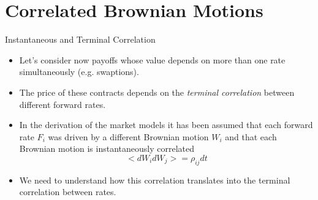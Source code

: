 \documentclass{beamer}
\begin{document}
\section{Correlated Brownian Motions}
\begin{frame}{Instantaneous and Terminal Correlation}
\begin{itemize}
\item<1-> Let's consider now payoffs whose value depends on more than one rate simultaneously (e.g. swaptions).
\item<1-> The price of these contracts depends on the \emph{terminal correlation} between different forward rates.
\item<2-> In the derivation of the market models it has been assumed that each forward rate $F_i$ was driven by a different Brownian motion $W_i$ and that each Brownian motion is instantaneously correlated
\begin{equation}
< dW_i dW_j> = \rho_{ij} dt
\end{equation}
\item<3-> We need to understand how this correlation translates into the terminal correlation between rates.
\end{itemize}
\end{frame}
\end{document}
